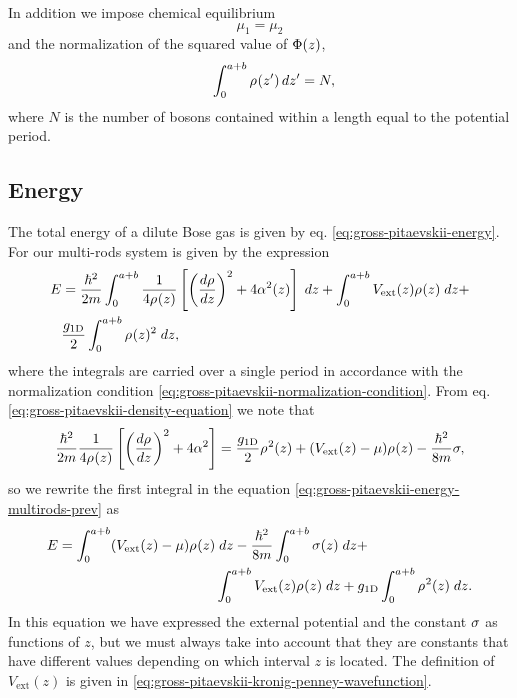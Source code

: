 %
In addition we impose chemical equilibrium
%
\begin{equation}
  \label{eq:gross-pitaevskii-chemical-equlibrium}
  \mu_1 = \mu_2
\end{equation}
%
and the normalization of the squared value of ${\Phi}(z)$,
%
\begin{equation}
  \label{eq:gross-pitaevskii-normalization-condition}
  \qquad \int_{0}^{a+b} {\rho_{}}(z') \, dz' = N,
\end{equation}
%
where $N$ is the number of bosons contained within a length equal to the
potential period.


\subsection{Energy}

The total energy of a dilute Bose gas is given by eq.
\eqref{eq:gross-pitaevskii-energy}. For our multi-rods system is given by the
expression
%
\begin{align}
  \label{eq:gross-pitaevskii-energy-multirods-prev}
  \nonumber E & = \frac{\hbar^2}{2m} \int_{0}^{a+b} \frac{1}{4 {\rho_{}}(z)} \left[
    \left(\frac{d {\rho_{}} }{dz}\right)^2 + 4 \alpha^2(z)
    \right] \; dz +
  \int_{0}^{a+b} V_{\mathrm{ext}}(z) {\rho_{}}(z) \; dz +                           \\
              & \frac{g_{ \mathrm{1D} }}{2} \int_{0}^{a+b} {\rho_{}}(z)^2 \; dz,
\end{align}
%
where the integrals are carried over a single period in accordance with the
normalization condition \eqref{eq:gross-pitaevskii-normalization-condition}.
From eq. \eqref{eq:gross-pitaevskii-density-equation} we note that
%
\begin{equation}
  \frac{\hbar^2}{2m} \frac{1}{4 {\rho_{}}(z)} \left[\left(\frac{d {\rho_{}}}{dz}\right)^2 + 4 \alpha^2 \right] =
  \frac{g_{ \mathrm{1D} }}{2} {\rho_{}}^2(z) + (V_{\mathrm{ext}}(z)  - \mu) {\rho_{}}(z) - \frac{\hbar^2}{8 m} \sigma,
\end{equation}
%
so we rewrite the first integral in the equation
\eqref{eq:gross-pitaevskii-energy-multirods-prev} as
%
\begin{align}
  \label{eq:gross-pitaevskii-energy-multirods}
  \nonumber E = \int_{0}^{a+b} (V_{\mathrm{ext}}(z) - \mu) {\rho_{}}(z) & \; dz -
  \frac{\hbar^2}{8m} \int_{0}^{a+b} \sigma(z) \; dz +                                                                     \\
                                                                     & \int_{0}^{a+b} V_{\mathrm{ext}}(z) {\rho_{}}(z) \; dz +
  g_{ \mathrm{1D} } \int_{0}^{a+b} {\rho_{}}^2(z) \; dz.
\end{align}
%
In this equation we have expressed the external potential and the constant
$\sigma$ as functions of $z$, but we must always take into account that they
are constants that have different values depending on which interval $z$ is
located. The definition of $V_{\mathrm{ext}}(z)$ is given in
\eqref{eq:gross-pitaevskii-kronig-penney-wavefunction}.


